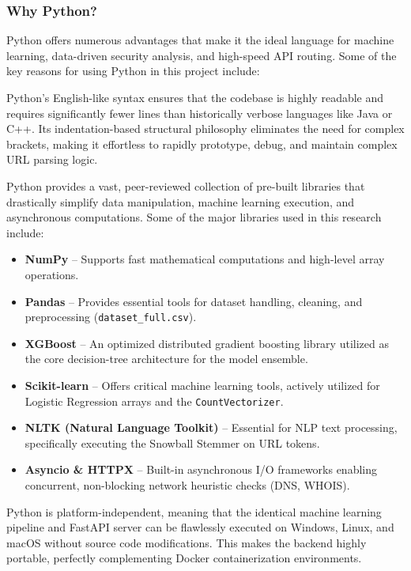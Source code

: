 \subsubsection*{Why Python?}
\noindent
Python offers numerous advantages that make it the ideal language for machine learning, data-driven security analysis, and high-speed API routing. Some of the key reasons for using Python in this project include:


\noindent
Python's English-like syntax ensures that the codebase is highly readable and requires significantly fewer lines than historically verbose languages like Java or C++. Its indentation-based structural philosophy eliminates the need for complex brackets, making it effortless to rapidly prototype, debug, and maintain complex URL parsing logic.


\noindent
Python provides a vast, peer-reviewed collection of pre-built libraries that drastically simplify data manipulation, machine learning execution, and asynchronous computations. Some of the major libraries used in this research include:

\begin{itemize}
\item \textbf{NumPy} -- Supports fast mathematical computations and high-level array operations.
\item \textbf{Pandas} -- Provides essential tools for dataset handling, cleaning, and preprocessing (\texttt{dataset\_full.csv}).
\item \textbf{XGBoost} -- An optimized distributed gradient boosting library utilized as the core decision-tree architecture for the model ensemble.
\item \textbf{Scikit-learn} -- Offers critical machine learning tools, actively utilized for Logistic Regression arrays and the \texttt{CountVectorizer}.
\item \textbf{NLTK (Natural Language Toolkit)} -- Essential for NLP text processing, specifically executing the Snowball Stemmer on URL tokens.
\item \textbf{Asyncio \& HTTPX} -- Built-in asynchronous I/O frameworks enabling concurrent, non-blocking network heuristic checks (DNS, WHOIS).
\end{itemize}

\noindent
Python is platform-independent, meaning that the identical machine learning pipeline and FastAPI server can be flawlessly executed on Windows, Linux, and macOS without source code modifications. This makes the backend highly portable, perfectly complementing Docker containerization environments.

